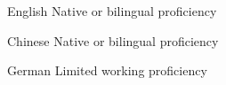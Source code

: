 

\begin{cvskills}

  \cvskill
    {English} %
    {Native or bilingual proficiency} %
  
  \cvskill
    {Chinese} %
    {Native or bilingual proficiency} %
  
  \cvskill
    {German} %
    {Limited working proficiency} %

\end{cvskills}
